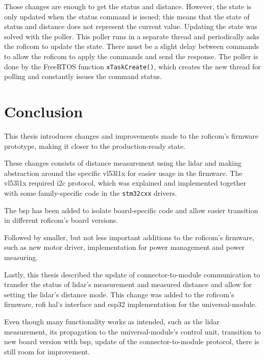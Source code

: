 \documentclass[
  digital,     %
  oneside,     %
  nosansbold,  %
  nocolorbold, %
  nolof,         %
  nolot,         %
]{fithesis4}
\begin{document}
{{{Those changes are enough to get the status and distance. However, the state is only updated when the status command is issued; this means that the state of status and distance does not represent the current value. Updating the state was solved with the poller. This poller runs in a separate thread and periodically asks the \acrshort{roficom} to update the state. There must be a slight delay between commands to allow the \acrshort{roficom} to apply the commands and send the response. The poller is done by the FreeRTOS function \lstinline|xTaskCreate()|, which creates the new thread for polling and constantly issues the command status.

\chapter{Conclusion}

This thesis introduces changes and improvements made to the \acrshort{roficom}'s firmware prototype, making it closer to the production-ready state.

These changes consists of distance measurement using the \acrshort{lidar} and making abstraction around the specific \gls{vl53l1x} for easier usage in the firmware. The \gls{vl53l1x} required \acrshort{i2c} protocol, which was explained and implemented together with some family-specific code in the \verb|stm32cxx| drivers.

The \acrlong{bsp} has been added to isolate board-specific code and allow easier transition in different \acrshort{roficom}'s board versions.

Followed by smaller, but not less important additions to the \acrshort{roficom}'s firmware, such as new motor driver, implementation for power management and power measuring.

Lastly, this thesis described the update of connector-to-module communication to transfer the status of \acrshort{lidar}'s measurement and measured distance and allow for setting the \acrshort{lidar}'s distance mode. This change was added to the \acrshort{roficom}'s firmware, \acrshort{rofi} \acrshort{hal}'s interface and esp32 implementation for the \gls{universal-module}.

Even though many functionality works as intended, such as the \acrshort{lidar} measurement, its propagation to the \gls{universal-module}'s control unit, transition to new board version with \acrlong{bsp}, update of the connector-to-module protocol, there is still room for improvement.

}}}
\end{document}
